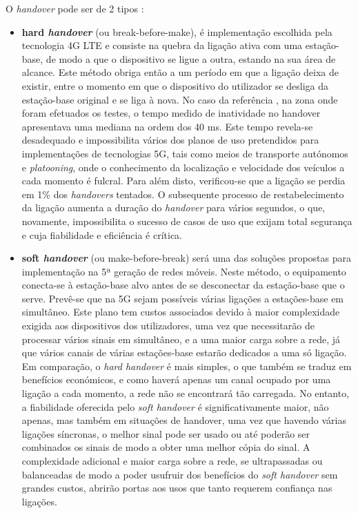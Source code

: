 \documentclass{llncs}
\begin{document}
O \textit{handover} pode ser de 2 tipos :
\begin{itemize}
    \item \textbf{hard \textit{handover}} (ou break-before-make), é implementação escolhida pela tecnologia 4G LTE e consiste na quebra da ligação ativa com uma estação-base, de modo a que o dispositivo se ligue a outra, estando na sua área de alcance. Este método obriga então a um período em que a ligação deixa de existir, entre o momento em que o dispositivo do utilizador se desliga da estação-base original e se liga à nova. No caso da referência \cite{magazine}, na zona onde foram efetuados os testes, o tempo medido de inatividade no handover apresentava uma mediana na ordem dos 40 ms. Este tempo revela-se desadequado e impossibilita vários dos planos de uso pretendidos para implementações de tecnologias 5G, tais como meios de transporte autónomos e \textit{platooning}, onde o conhecimento da localização e velocidade dos veículos a cada momento é fulcral. Para além disto, verificou-se que a ligação se perdia em 1\% dos \textit{handovers} tentados. O subsequente processo de restabelecimento da ligação aumenta a duração do \textit{handover} para vários segundos, o que, novamente, impossibilita o sucesso de casos de uso que exijam total segurança e cuja fiabilidade e eficiência é crítica.
    \item \textbf{soft \textit{handover}} (ou make-before-break) será uma das soluções propostas para implementação na 5ª geração de redes móveis. Neste método, o equipamento conecta-se à estação-base alvo antes de se desconectar da estação-base que o serve. Prevê-se que na 5G sejam possíveis várias ligações a estações-base em simultâneo. Este plano tem custos associados devido à maior complexidade exigida aos dispositivos dos utilizadores, uma vez que necessitarão de processar vários sinais em simultâneo, e a uma maior carga sobre a rede, já que vários canais de várias estações-base estarão dedicados a uma só ligação. Em comparação, o \textit{hard handover} é mais simples, o que também se traduz em benefícios económicos, e como haverá apenas um canal ocupado por uma ligação a cada momento, a rede não se encontrará tão carregada. No entanto, a fiabilidade oferecida pelo \textit{soft handover} é significativamente maior, não apenas, mas também em situações de handover, uma vez que havendo várias ligações síncronas, o melhor sinal pode ser usado ou até poderão ser combinados os sinais de modo a obter uma melhor cópia do sinal. A complexidade adicional e maior carga sobre a rede, se ultrapassadas ou balanceadas de modo a poder usufruir dos benefícios do \textit{soft handover} sem grandes custos, abrirão portas aos usos que tanto requerem confiança nas ligações.
\end{itemize}
\end{document}
